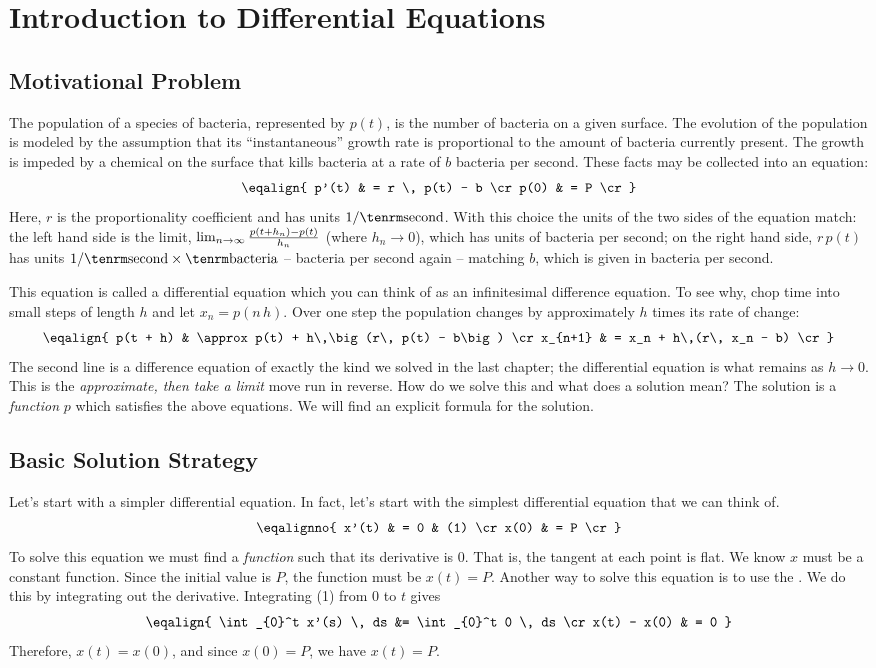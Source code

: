 %
%

\chapter{Introduction to Differential Equations}

\section{Motivational Problem}
The population of a species of bacteria, represented by $p(t)$, is 
the number of bacteria on a given surface. The evolution of the population is modeled by the 
assumption that its ``instantaneous'' growth rate
is proportional to the amount of bacteria currently present. The growth 
is impeded by a chemical on the surface that kills bacteria at a rate of $b$ bacteria per second.
These facts may be collected into an equation:
$$
\eqalign{
p'(t) & = r \, p(t) - b \cr
p(0) & = P \cr
}
$$
Here, $r$ is the proportionality coefficient and has units $1/{\rm second}$.
With this choice the units of the two sides of the equation match: the left
hand side is the limit,
$\lim_{n  \rightarrow \infty} {p(t+h_n) - p(t) \over h_n}$ (where $h_n \rightarrow 0$),
which has units of bacteria per second; on the right hand side, $r \, p(t)$ has
units $1/{\rm second} \times {\rm bacteria}$ -- bacteria per second again --
matching $b$, which is given in bacteria per second.


This equation is called a differential equation which you can think of as an
infinitesimal difference equation. To see why, chop time into small steps of
length $h$ and let $x_n = p(n\,h)$. Over one step the population changes by
approximately $h$ times its rate of change:
$$
\eqalign{
p(t + h) & \approx p(t) + h\,\big(r\, p(t) - b\big) \cr
x_{n+1} & = x_n + h\,(r\, x_n - b) \cr
}
$$
The second line is a difference equation of exactly the kind we solved in the
last chapter; the differential equation is what remains as $h \rightarrow 0$.
This is the {\it approximate, then take a limit\/} move run in reverse.
How do we solve this and what does a solution mean? The solution is 
a {\it function\/} $p$ which satisfies the above equations. We will find an explicit formula for the solution.

\section{Basic Solution Strategy}
Let's start with a simpler differential equation. In fact, let's start with 
the simplest differential equation that we can think of.
$$
\eqalignno{
x'(t) & = 0 & (1) \cr
x(0) & = P \cr
}
$$
To solve this equation we must find a {\it function\/} such that 
its derivative is $0$. That is, the tangent at each point is flat.
We know $x$ must be a constant function. Since the initial 
value is $P$, the function must be $x(t) = P$.
Another way to solve this equation is to use the . We do this by integrating out the derivative. 
Integrating (1) from $0$ to $t$ gives
$$
\eqalign{
\int_{0}^t x'(s) \, ds &= \int_{0}^t 0 \, ds  \cr
x(t) - x(0) & = 0 
}
$$
Therefore, $x(t) = x(0)$, and since $x(0) = P$, we have 
$x(t) = P$.

